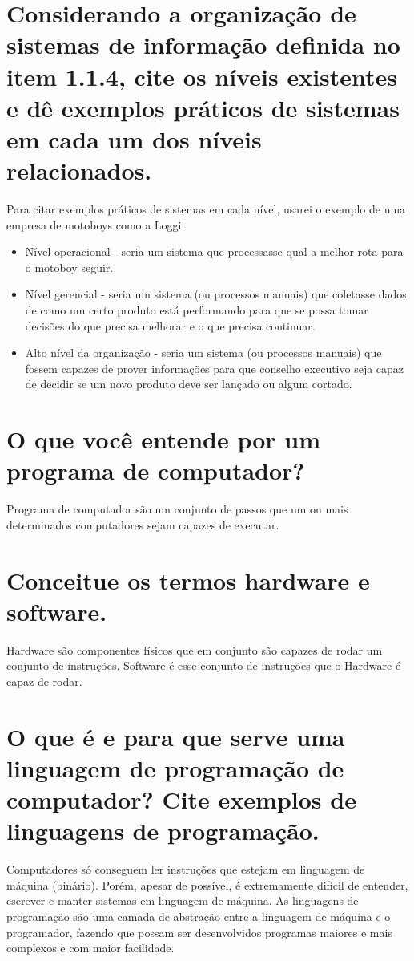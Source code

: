 \documentclass[
	12pt,				%
	openright,			%
	twoside,			%
	a4paper,			%
	english,			%
	french,				%
	spanish,			%
	brazil				%
	]{abntex2}
\begin{document}
\section{Considerando a organização de sistemas de informação definida no item 1.1.4, cite os níveis existentes e dê exemplos práticos de sistemas em cada um dos níveis relacionados.}
\label{sec:orge07ea7c}
Para citar exemplos práticos de sistemas em cada nível, usarei o exemplo de uma
empresa de motoboys como a Loggi.
\begin{itemize}
\item Nível operacional - seria um sistema que processasse qual a melhor rota para o
motoboy seguir.
\item Nível gerencial - seria um sistema (ou processos manuais) que coletasse dados
de como um certo produto está performando para que se possa tomar decisões do
que precisa melhorar e o que precisa continuar.
\item Alto nível da organização - seria um sistema (ou processos manuais) que fossem
capazes de prover informações para que conselho executivo seja capaz de
decidir se um novo produto deve ser lançado ou algum cortado.
\end{itemize}
\section{O que você entende por um programa de computador?}
\label{sec:orgcf1ca0a}
Programa de computador são um conjunto de passos que um ou mais determinados
computadores sejam capazes de executar.
\section{Conceitue os termos hardware e software.}
\label{sec:org7ce455e}
Hardware são componentes físicos que em conjunto são capazes de rodar um
conjunto de instruções. Software é esse conjunto de instruções que o Hardware é
capaz de rodar.
\section{O que é e para que serve uma linguagem de programação de computador? Cite exemplos de linguagens de programação.}
\label{sec:orga73e533}
Computadores só conseguem ler instruções que estejam em linguagem de máquina
(binário). Porém, apesar de possível, é extremamente difícil de entender,
escrever e manter sistemas em linguagem de máquina. As linguagens de programação
são uma camada de abstração entre a linguagem de máquina e o programador,
fazendo que possam ser desenvolvidos programas maiores e mais complexos e com
maior facilidade.
\end{document}

